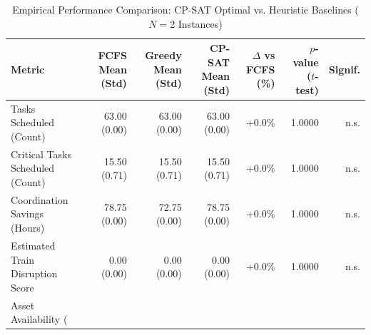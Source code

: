 \begin{table}[htbp]
\centering
\caption{Empirical Performance Comparison: CP-SAT Optimal vs. Heuristic Baselines ($N=2$ Instances)}
\label{tab:block_planner_benchmark}
\begin{tabular}{lrrrrrr}
\hline
\textbf{Metric} & \textbf{FCFS Mean (Std)} & \textbf{Greedy Mean (Std)} & \textbf{CP-SAT Mean (Std)} & \textbf{$\Delta$ vs FCFS (\%)} & \textbf{$p$-value ($t$-test)} & \textbf{Signif.} \\
\hline
Tasks Scheduled (Count) & 63.00 (0.00) & 63.00 (0.00) & 63.00 (0.00) & +0.0\% & 1.0000 & n.s. \\
Critical Tasks Scheduled (Count) & 15.50 (0.71) & 15.50 (0.71) & 15.50 (0.71) & +0.0\% & 1.0000 & n.s. \\
Coordination Savings (Hours) & 78.75 (0.00) & 72.75 (0.00) & 78.75 (0.00) & +0.0\% & 1.0000 & n.s. \\
Estimated Train Disruption Score & 0.00 (0.00) & 0.00 (0.00) & 0.00 (0.00) & +0.0\% & 1.0000 & n.s. \\
Asset Availability (%
\hline
\multicolumn{7}{l}{\footnotesize $*** p < 0.01$, $** p < 0.05$, n.s.: not significant} \\
\end{tabular}
\end{table}
